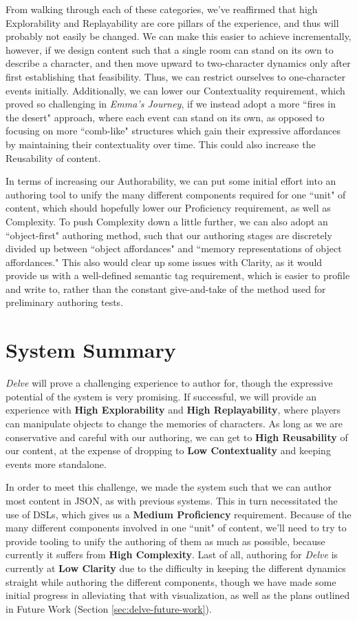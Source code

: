 From walking through each of these categories, we've reaffirmed that high Explorability and Replayability are core pillars of the experience, and thus will probably not easily be changed. We can make this easier to achieve incrementally, however, if we design content such that a single room can stand on its own to describe a character, and then move upward to two-character dynamics only after first establishing that feasibility. Thus, we can restrict ourselves to one-character events initially. Additionally, we can lower our Contextuality requirement, which proved so challenging in \textit{Emma's Journey}, if we instead adopt a more ``fires in the desert" approach, where each event can stand on its own, as opposed to focusing on more ``comb-like" structures which gain their expressive affordances by maintaining their contextuality over time. This could also increase the Reusability of content.

In terms of increasing our Authorability, we can put some initial effort into an authoring tool to unify the many different components required for one ``unit" of content, which should hopefully lower our Proficiency requirement, as well as Complexity. To push Complexity down a little further, we can also adopt an ``object-first" authoring method, such that our authoring stages are discretely divided up between ``object affordances" and ``memory representations of object affordances." This also would clear up some issues with Clarity, as it would provide us with a well-defined semantic tag requirement, which is easier to profile and write to, rather than the constant give-and-take of the method used for preliminary authoring tests.

\section{System Summary}\label{sec:delve-system-summary}

\textit{Delve} will prove a challenging experience to author for, though the expressive potential of the system is very promising. If successful, we will provide an experience with \textbf{High Explorability} and \textbf{High Replayability}, where players can manipulate objects to change the memories of characters. As long as we are conservative and careful with our authoring, we can get to \textbf{High Reusability} of our content, at the expense of dropping to \textbf{Low Contextuality} and keeping events more standalone.

In order to meet this challenge, we made the system such that we can author most content in JSON, as with previous systems. This in turn necessitated the use of DSLs, which gives us a \textbf{Medium Proficiency} requirement. Because of the many different components involved in one ``unit" of content, we'll need to try to provide tooling to unify the authoring of them as much as possible, because currently it suffers from \textbf{High Complexity}. Last of all, authoring for \textit{Delve} is currently at \textbf{Low Clarity} due to the difficulty in keeping the different dynamics straight while authoring the different components, though we have made some initial progress in alleviating that with visualization, as well as the plans outlined in Future Work (Section \ref{sec:delve-future-work}).